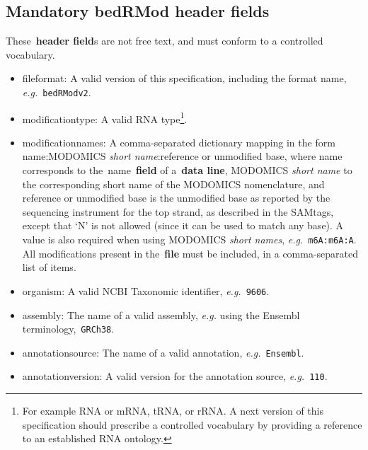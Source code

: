 \documentclass[11pt]{article}
\begin{document}
\subsection{Mandatory \acs{bedRMod} header fields}
These~\textbf{header field}s are not free text, and must conform to a controlled vocabulary.
\begin{itemize}
\item \textsf{fileformat}: A valid version of this specification, including the format name, \textit{e.g.}~\texttt{bedRModv2}. 

\item \textsf{modification\textunderscore type}: A valid RNA type\footnote{For example RNA or mRNA, tRNA, or rRNA. A next version of this specification should prescribe a controlled vocabulary by providing a reference to an established RNA ontology.}.

\item \textsf{modification\textunderscore names}: A comma-separated dictionary mapping in the form name:MODOMICS \emph{short name}:reference or unmodified base, where name corresponds to the~\textsf{name}~\textbf{field} of a~\textbf{data line}, MODOMICS \emph{short name} to the corresponding short name of the MODOMICS nomenclature, and reference or unmodified base is the unmodified base as reported by the sequencing instrument for the top strand, as described in the SAMtags, except that `N' is not allowed (since it can be used to match any base). A value is also required when using MODOMICS \emph{short names}, \textit{e.g.}~\texttt{m6A:m6A:A}. All modifications present in the~\textbf{file} must be included, in a comma-separated list of items.

\item \textsf{organism}: A valid NCBI Taxonomic identifier, \textit{e.g.}~\texttt{9606}.

\item \textsf{assembly}: The name of a valid assembly, \textit{e.g.} using the Ensembl terminology,~\texttt{GRCh38}. 

\item \textsf{annotation\textunderscore source}: The name of a valid annotation, \textit{e.g.}~\texttt{Ensembl}. 

\item \textsf{annotation\textunderscore version}: A valid version for the annotation source, \textit{e.g.}~\texttt{110}. 
\end{itemize}
\end{document}
